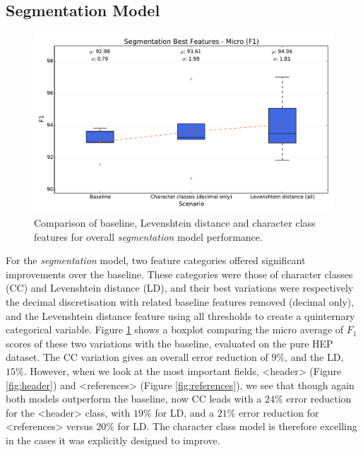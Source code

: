 \subsection{Segmentation Model}

\begin{figure}[h]
\center
\includegraphics[width=5.5in]{Figures/micro_segmentation.pdf}
\caption{Comparison of baseline, Levenshtein distance and character class features for overall \emph{segmentation} model performance.}
\label{fig:micro_segmentation}
\end{figure}

For the \emph{segmentation} model, two feature categories offered significant improvements over the baseline. These categories were those of character classes (CC) and Levenshtein distance (LD), and their best variations were respectively the decimal discretisation with related baseline features removed (decimal only), and the Levenshtein distance feature using all thresholds to create a quinternary categorical variable. Figure \ref{fig:micro_segmentation} shows a boxplot comparing the micro average of $F_1$ scores of these two variations with the baseline, evaluated on the pure HEP dataset. The CC variation gives an overall error reduction of $9\%$, and the LD, $15\%$. However, when we look at the most important fields, <header> (Figure \ref{fig:header}) and <references> (Figure \ref{fig:references}), we see that though again both models outperform the baseline, now CC leads with a $24\%$ error reduction for the <header> class, with $19\%$ for LD, and a $21\%$ error reduction for <references> versus $20\%$ for LD. The character class model is therefore excelling in the cases it was explicitly designed to improve.

